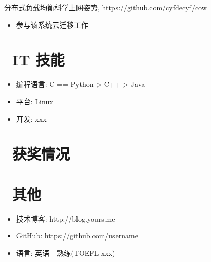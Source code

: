 \documentclass{resume}
\begin{document}
\begin{onehalfspacing}
分布式负载均衡科学上网姿势, https://github.com/cyfdecyf/cow
\begin{itemize}
  \item 参与该系统云迁移工作
\end{itemize}
\end{onehalfspacing}


\section{\faCogs\ IT 技能}
\begin{itemize}[parsep=0.5ex]
  \item 编程语言: C == Python > C++ > Java
  \item 平台: Linux
  \item 开发: xxx
\end{itemize}

\section{\faHeartO\ 获奖情况}

\section{\faInfo\ 其他}
\begin{itemize}[parsep=0.5ex]
  \item 技术博客: http://blog.yours.me
  \item GitHub: https://github.com/username
  \item 语言: 英语 - 熟练(TOEFL xxx)
\end{itemize}

%
%
\end{document}
